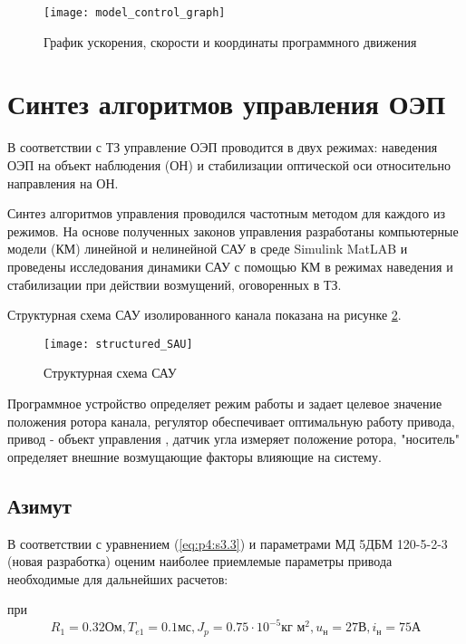 \begin{figure}
	\centering
	\texttt{[image: model\_control\_graph]}
	\caption{График ускорения, скорости и координаты программного движения}
	\label{fig:model_control_graph}
\end{figure}



\section{Синтез алгоритмов управления ОЭП} \label{ch:ch4/sect4-}

В соответствии с ТЗ управление ОЭП проводится в двух режимах:
наведения ОЭП на объект наблюдения (ОН) и стабилизации оптической оси относительно направления на ОН. 

Синтез алгоритмов управления проводился частотным методом \cite[]{Bessekerski} для каждого из режимов. На основе полученных законов управления разработаны компьютерные модели (КМ) линейной и нелинейной САУ в среде Simulink MatLAB и проведены исследования динамики САУ с помощью КМ в режимах наведения и стабилизации при действии возмущений, оговоренных в ТЗ.

Структурная схема САУ изолированного канала показана на рисунке \ref{fig:structured_SAU}.

\begin{figure}[ht]
	\centering
	\texttt{[image: structured\_SAU]}
	\caption{Структурная схема САУ}
	\label{fig:structured_SAU}
\end{figure}

Программное устройство определяет режим работы и задает целевое значение положения ротора канала, регулятор обеспечивает оптимальную работу привода, привод - объект управления , 
датчик угла измеряет положение ротора, "носитель" определяет внешние возмущающие факторы влияющие на систему.

\subsection{Азимут} \label{ch:ch4/sect4-/sub1}

В соответствии с уравнением (\ref{eq:p4:s3.3}) и параметрами МД 5ДБМ 120-5-2-3 (новая разработка) оценим наиболее приемлемые параметры привода необходимые для дальнейших расчетов:

при 
\[  R_1 = 0.32 \textit{Ом}, 
T_{e1} = 0.1 \textit{мс}, 
J_p = 0.75 \cdot 10^{-5} \textit{кг м}^2,  
u_\textit{н} = 27 \textit{В},
i_\textit{н} = 75 \textit{А} \]


